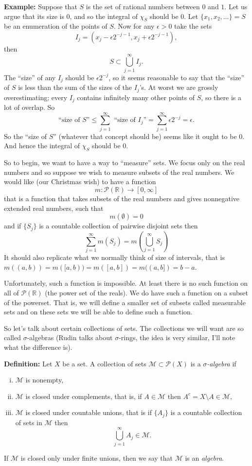 \documentclass[12pt]{book}
\newcommand{\R}{{\mathbb{R}}}
\newcommand{\sM}{{\mathcal{M}}}
\newcommand{\sP}{{\mathcal{P}}}
\theoremstyle{plain}
\theoremstyle{remark}
\theoremstyle{definition}
\theoremstyle{exercise}
\theoremstyle{example}
\begin{document}
\medskip

\textbf{Example:}
Suppose that $S$ is the set of rational numbers between $0$ and $1$.  Let us
argue that its size is 0, and so the integral of $\chi_S$ should be 0.
Let $\{ x_1, x_2, \ldots \} = S$ be an enumeration
of the points of $S$.  Now for any $\epsilon > 0$
take the sets
$$I_j = (x_j - \epsilon 2^{-j-1}, 
x_j + \epsilon 2^{-j-1}),$$
then
$$
S \subset \bigcup_{j=1}^\infty I_j .
$$
The ``size'' of any $I_j$ should be $\epsilon 2^{-j}$, so it seems reasonable
to say that the ``size'' of $S$ is less than the sum of the sizes of the $I_j$'s.
At worst we are grossly overestimating; every $I_j$ contains
infinitely
many other points of $S$, so there is a lot of overlap.  So
$$
\text{``size of $S$''} \leq
\sum_{j=1}^\infty \text{ ``size of $I_j$''} =
\sum_{j=1}^\infty \epsilon 2^{-j} = \epsilon.
$$
So the ``size of $S$'' (whatever that concept should be) seems like it ought
to be 0.  And hence the integral of $\chi_S$ should be 0.

\medskip

So to begin, we want to have a way to ``measure'' sets.  We focus
only on the real numbers and so suppose we wish to measure subsets of the real
numbers.  We would like (our Christmas wish) to have a function
$$
m \colon \sP(\R) \to [0,\infty]
$$
that is a function that takes subsets of the real numbers
and gives nonnegative extended real numbers, such that 
$$
m(\emptyset) = 0
$$
and if $\{ S_j \}$ is a countable collection of pairwise disjoint sets then
$$
\sum_{j=1}^\infty m(S_j) = m\left( \bigcup_{j=1}^\infty S_j \right)
$$
It should also replicate what we normally think of size of intervals,
that is $m( (a,b) ) = m([a,b) ) = m([a,b]) = m((a,b]) = b-a$.

Unfortunately, such a function is impossible.  At least there is
no such function on all of $\sP(\R)$ (the power set of the reals).
We do have such a function on a subset of the powerset.  That is,
we will define a smaller set of subsets called measurable sets
and on these sets we will be able to define such a function.

So let's talk about certain collections of sets.  The collections we will
want are so called $\sigma$-algebras (Rudin talks about $\sigma$-rings, the
idea is very similar, I'll note what the difference is).

\medskip

\textbf{Definition:}
Let $X$ be a set.
A collection of sets $\sM \subset \sP(X)$ is a \emph{$\sigma$-algebra} if
\begin{enumerate}[(i)]
\item $\sM$ is nonempty,
\item $\sM$ is closed under complements, that is, if $A \in \sM$ then
$A^c = X \setminus A \in \sM$,
\item $\sM$ is closed under countable unions, that is if $\{ A_j \}$ is
a countable collection of sets in $\sM$ then
$$
\bigcup_{j=1}^\infty A_j \in \sM .
$$
\end{enumerate}
If $\sM$ is closed only under finite unions, then we say that $\sM$ is an
\emph{algebra}.
\end{document}
